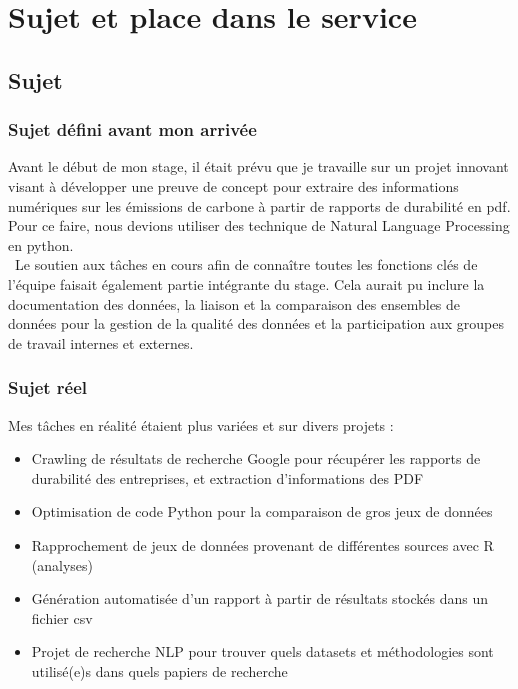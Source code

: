 \section{Sujet et place dans le service}
\subsection{Sujet}
\subsubsection{Sujet défini avant mon arrivée}

Avant le début de mon stage, il était prévu que je travaille sur un projet innovant visant à développer une preuve de concept pour extraire des informations numériques sur les émissions de carbone à partir de rapports de durabilité en pdf. 
Pour ce faire, nous devions utiliser des technique de Natural Language Processing en python.\\

~Le soutien aux tâches en cours afin de connaître toutes les fonctions clés de l'équipe faisait également partie intégrante du stage. 
Cela aurait pu inclure la documentation des données, la liaison et la comparaison des ensembles de données pour la gestion de la qualité des données et la participation aux groupes de travail internes et externes.


\subsubsection{Sujet réel}

Mes tâches en réalité étaient plus variées et sur divers projets :
\begin{itemize}
    \item Crawling de résultats de recherche Google pour récupérer les rapports de durabilité des entreprises, et extraction d'informations des PDF
    \item Optimisation de code Python pour la comparaison de gros jeux de données
    \item Rapprochement de jeux de données provenant de différentes sources avec R (analyses)
    \item Génération automatisée d'un rapport à partir de résultats stockés dans un fichier csv
    \item Projet de recherche NLP pour trouver quels datasets et méthodologies sont utilisé(e)s dans quels papiers de recherche
\end{itemize}


